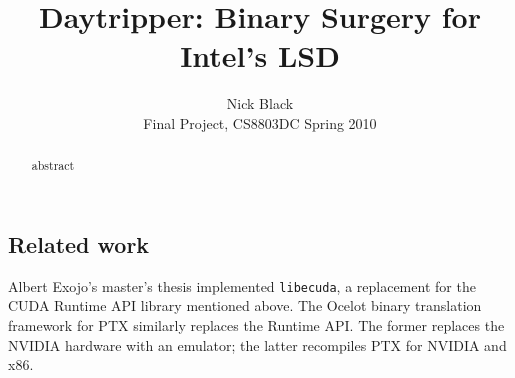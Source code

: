 \documentclass[letterpaper,10pt]{article}
\title{Daytripper: Binary Surgery for Intel's LSD}
\author{Nick Black\\
Final Project, CS8803DC Spring 2010}
\date{}
\begin{document}
\maketitle

\begin{abstract}
abstract
\end{abstract}

\begin{multicols}{2}
\section{Related work}
Albert Exojo's master's thesis implemented \texttt{libecuda}\cite{exojo}, a replacement for
the CUDA Runtime API library mentioned above. The Ocelot\cite{ocelot} binary translation
framework for PTX similarly replaces the Runtime API. The former replaces the NVIDIA
hardware with an emulator; the latter recompiles PTX for NVIDIA and x86.


\end{multicols}
\end{document}
